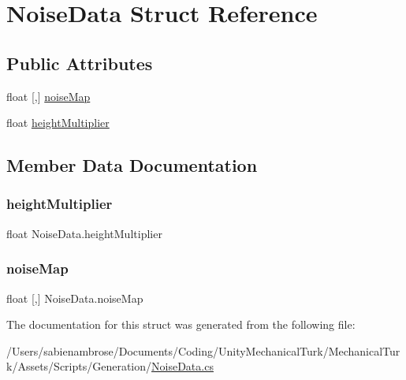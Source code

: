 \hypertarget{struct_noise_data}{}\section{Noise\+Data Struct Reference}
\label{struct_noise_data}
\subsection*{Public Attributes}
\begin{DoxyCompactItemize}
\item 
float \mbox{[},\mbox{]} \mbox{\hyperlink{struct_noise_data_a17fa4f41e75b96ad3ae8b1459ab305aa}{noise\+Map}}
\item 
float \mbox{\hyperlink{struct_noise_data_ae3d28ea7c4a4fa91bd5a75b34ef103cc}{height\+Multiplier}}
\end{DoxyCompactItemize}


\subsection{Member Data Documentation}
\mbox{\label{struct_noise_data_ae3d28ea7c4a4fa91bd5a75b34ef103cc}} 
\subsubsection{\texorpdfstring{height\+Multiplier}{heightMultiplier}}
{\footnotesize\ttfamily float Noise\+Data.\+height\+Multiplier}

\mbox{\label{struct_noise_data_a17fa4f41e75b96ad3ae8b1459ab305aa}} 
\subsubsection{\texorpdfstring{noise\+Map}{noiseMap}}
{\footnotesize\ttfamily float \mbox{[},\mbox{]} Noise\+Data.\+noise\+Map}



The documentation for this struct was generated from the following file\+:\begin{DoxyCompactItemize}
\item 
/\+Users/sabienambrose/\+Documents/\+Coding/\+Unity\+Mechanical\+Turk/\+Mechanical\+Turk/\+Assets/\+Scripts/\+Generation/\mbox{\hyperlink{_noise_data_8cs}{Noise\+Data.\+cs}}\end{DoxyCompactItemize}
